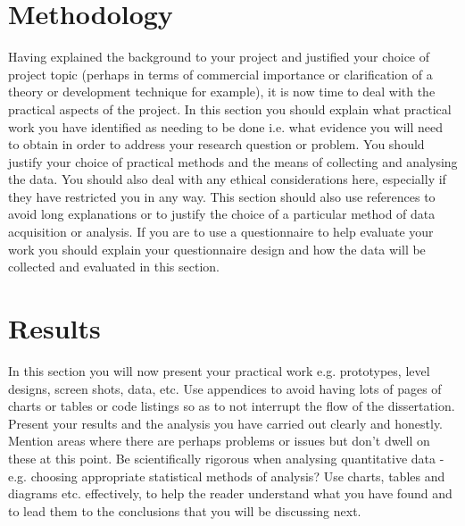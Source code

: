 \documentclass[a4paper, 12pt]{article}
\begin{document}
\pagebreak


\section{Methodology} %
Having explained the background to your project and justified your choice of project topic (perhaps in terms of commercial importance or clarification of a theory or development technique for example), it is now time to deal with the practical aspects of the project. In this section you should explain what practical work you have identified as needing to be done i.e. what evidence you will need to obtain in order to address your research question or problem. You should justify your choice of practical methods and the means of collecting and analysing the data. You should also deal with any ethical considerations here, especially if they have restricted you in any way. This section should also use references to avoid long explanations or to justify the choice of a particular method of data acquisition or analysis. If you are to use a questionnaire to help evaluate your work you should explain your questionnaire design and how the data will be collected and evaluated in this section.

\pagebreak


\section{Results} %
In this section you will now present your practical work e.g. prototypes, level designs, screen shots, data, etc. Use appendices to avoid having lots of pages of charts or tables or code listings so as to not interrupt the flow of the dissertation. Present your results and the analysis you have carried out clearly and honestly. Mention areas where there are perhaps problems or issues but don’t dwell on these at this point. Be scientifically rigorous when analysing quantitative data - e.g. choosing appropriate statistical methods of analysis? Use charts, tables and diagrams etc. effectively, to help the reader understand what you have found and to lead them to the conclusions that you will be discussing next.

\pagebreak
\end{document}

